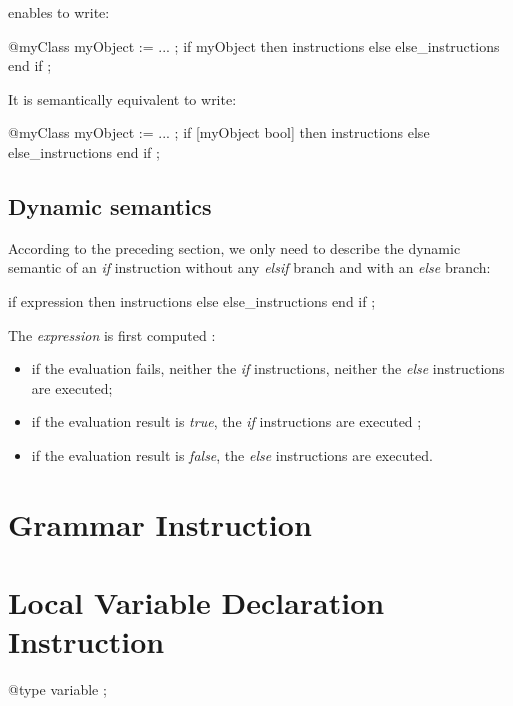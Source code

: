 enables to write:
{
\begin{galgascode}
@myClass myObject := ... ;
if myObject then
  instructions
else
  else_instructions
end if ;
\end{galgascode}
}

It is semantically equivalent to write:
{
\begin{galgascode}
@myClass myObject := ... ;
if [myObject bool] then
  instructions
else
  else_instructions
end if ;
\end{galgascode}
}


\subsection{Dynamic semantics}

According to the preceding section, we only need to describe the dynamic semantic of an \emph{if} instruction without any \emph{elsif} branch and with an \emph{else} branch:
{
\begin{galgascode}
if expression then
  instructions
else
  else_instructions
end if ;  
\end{galgascode}
}



The \emph{expression} is first computed :
\begin{itemize}
\item if the evaluation fails, neither the \emph{if} instructions, neither the \emph{else} instructions are executed;
\item if the evaluation result is \emph{true}, the \emph{if} instructions are executed ;
\item if the evaluation result is \emph{false}, the \emph{else} instructions are executed.
\end{itemize}


\section{Grammar Instruction}

\section{Local Variable Declaration Instruction}


{
\begin{galgascode}
@type variable ;
\end{galgascode}
}

